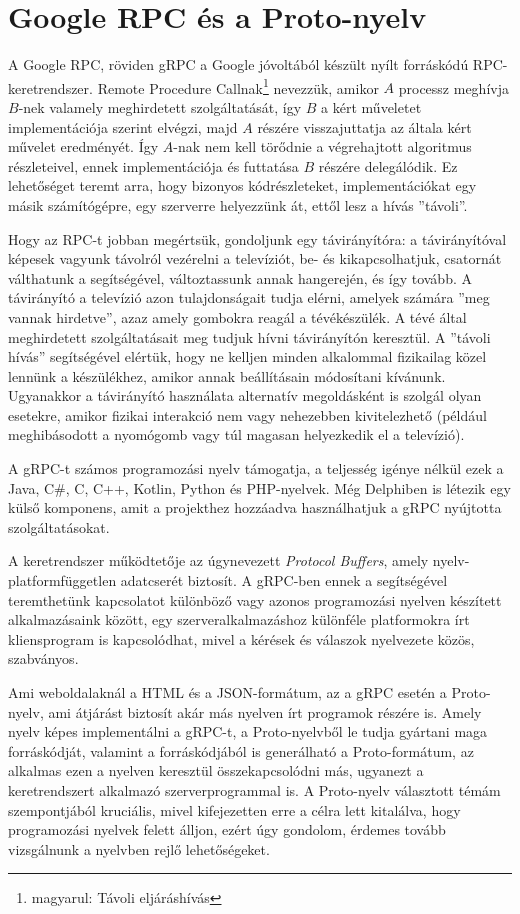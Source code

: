 \documentclass[tocnopagenum]{thesis-ekf}
\theoremstyle{definition}
\theoremstyle{remark}
\begin{document}
	\section{Google RPC és a Proto-nyelv}
	\label{grpc}
	A Google RPC, röviden gRPC a Google jóvoltából készült nyílt forráskódú RPC-keretrendszer. Remote Procedure Callnak\footnote{magyarul: Távoli eljáráshívás} nevezzük, amikor $A$ processz meghívja $B$-nek valamely meghirdetett szolgáltatását, így $B$ a kért műveletet implementációja szerint elvégzi, majd $A$ részére visszajuttatja az általa kért művelet eredményét. Így $A$-nak nem kell törődnie a végrehajtott algoritmus részleteivel, ennek implementációja és futtatása $B$ részére delegálódik. Ez lehetőséget teremt arra, hogy bizonyos kódrészleteket, implementációkat egy másik számítógépre, egy szerverre helyezzünk át, ettől lesz a hívás ''távoli''.
	
	Hogy az RPC-t jobban megértsük, gondoljunk egy távirányítóra: a távirányítóval képesek vagyunk távolról vezérelni a televíziót, be- és kikapcsolhatjuk, csatornát válthatunk a segítségével, változtassunk annak hangerején, és így tovább. A távirányító a televízió azon tulajdonságait tudja elérni, amelyek számára ''meg vannak hirdetve'', azaz amely gombokra reagál a tévékészülék. A tévé által meghirdetett szolgáltatásait meg tudjuk hívni távirányítón keresztül. A ''távoli hívás'' segítségével elértük, hogy ne kelljen minden alkalommal fizikailag közel lennünk a készülékhez, amikor annak beállításain módosítani kívánunk. Ugyanakkor a távirányító használata alternatív megoldásként is szolgál olyan esetekre, amikor fizikai interakció nem vagy nehezebben kivitelezhető (például meghibásodott a nyomógomb vagy túl magasan helyezkedik el a televízió).
	
	A gRPC-t számos programozási nyelv támogatja, a teljesség igénye nélkül ezek a Java, C\#, C, C++, Kotlin, Python és PHP-nyelvek. Még Delphiben is létezik egy külső komponens, amit a projekthez hozzáadva használhatjuk a gRPC nyújtotta szolgáltatásokat. \cite{grpc_delphi}
	
	A keretrendszer működtetője az úgynevezett \textit{Protocol Buffers}, amely nyelv- platformfüggetlen adatcserét biztosít. A gRPC-ben ennek a segítségével teremthetünk kapcsolatot különböző vagy azonos programozási nyelven készített alkalmazásaink között, egy szerveralkalmazáshoz különféle platformokra írt kliensprogram is kapcsolódhat, mivel a kérések és válaszok nyelvezete közös, szabványos. 
	
	Ami weboldalaknál a HTML és a JSON-formátum, az a gRPC esetén a Proto-nyelv, ami átjárást biztosít akár más nyelven írt programok részére is. Amely nyelv képes implementálni a gRPC-t, a Proto-nyelvből le tudja gyártani maga forráskódját, valamint a forráskódjából is generálható a Proto-formátum, az alkalmas ezen a nyelven keresztül összekapcsolódni más, ugyanezt a keretrendszert alkalmazó szerverprogrammal is. A Proto-nyelv választott témám szempontjából kruciális, mivel kifejezetten erre a célra lett kitalálva, hogy programozási nyelvek felett álljon, ezért úgy gondolom, érdemes tovább vizsgálnunk a nyelvben rejlő lehetőségeket.
	
\end{document}
